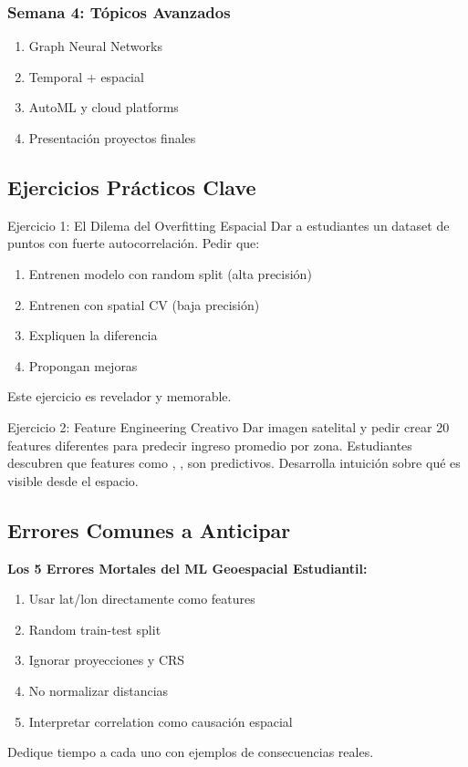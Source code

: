 \documentclass[12pt,a4paper]{article}
\begin{document}
\subsubsection{Semana 4: Tópicos Avanzados}
\begin{enumerate}
    \item Graph Neural Networks
    \item Temporal + espacial
    \item AutoML y cloud platforms
    \item Presentación proyectos finales
\end{enumerate}

\subsection{Ejercicios Prácticos Clave}

\begin{ejemplo}{Ejercicio 1: El Dilema del Overfitting Espacial}
Dar a estudiantes un dataset de puntos con fuerte autocorrelación. Pedir que:
\begin{enumerate}
    \item Entrenen modelo con random split (alta precisión)
    \item Entrenen con spatial CV (baja precisión)
    \item Expliquen la diferencia
    \item Propongan mejoras
\end{enumerate}

Este ejercicio es revelador y memorable.
\end{ejemplo}

\begin{ejemplo}{Ejercicio 2: Feature Engineering Creativo}
Dar imagen satelital y pedir crear 20 features diferentes para predecir ingreso promedio por zona. Estudiantes descubren que features como , ,  son predictivos. Desarrolla intuición sobre qué es visible desde el espacio.
\end{ejemplo}

\subsection{Errores Comunes a Anticipar}

\begin{alertbox}
\textbf{Los 5 Errores Mortales del ML Geoespacial Estudiantil:}
\begin{enumerate}
    \item Usar lat/lon directamente como features
    \item Random train-test split
    \item Ignorar proyecciones y CRS
    \item No normalizar distancias
    \item Interpretar correlation como causación espacial
\end{enumerate}

Dedique tiempo a cada uno con ejemplos de consecuencias reales.
\end{alertbox}
\end{document}

